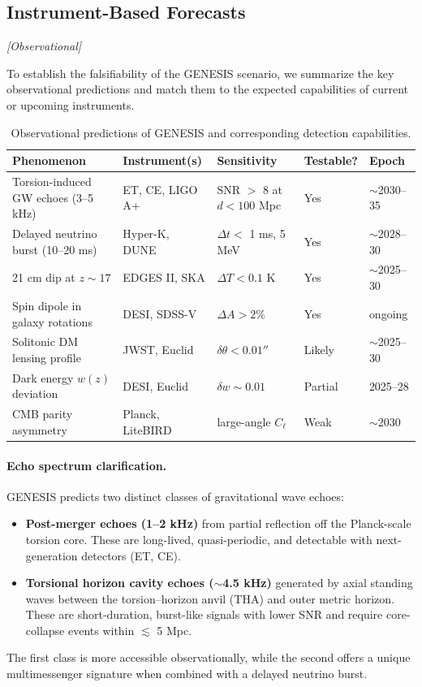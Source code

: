\documentclass{article}
\newcommand{\obstag}{\textcolor{green!60!black}{\textit{[Observational]}}}
\begin{document}
\subsection{Instrument-Based Forecasts}
\obstag


To establish the falsifiability of the GENESIS scenario, we summarize the key observational predictions
and match them to the expected capabilities of current or upcoming instruments.

\begin{table}[h!]
\centering
\caption{Observational predictions of GENESIS and corresponding detection capabilities.}
\begin{tabular}{lllll}
\toprule
\textbf{Phenomenon} & \textbf{Instrument(s)} & \textbf{Sensitivity} & \textbf{Testable?} & \textbf{Epoch} \\
\midrule
Torsion-induced GW echoes (3–5 kHz) & ET, CE, LIGO A+ & SNR $>$ 8 at $d < 100$ Mpc & Yes & $\sim$2030–35 \\
Delayed neutrino burst (10–20 ms) & Hyper-K, DUNE & $\Delta t <$ 1 ms, 5 MeV & Yes & $\sim$2028–30 \\
21 cm dip at $z \sim 17$ & EDGES II, SKA & $\Delta T < 0.1$ K & Yes & $\sim$2025–30 \\
Spin dipole in galaxy rotations & DESI, SDSS-V & $\Delta A > 2\%$ & Yes & ongoing \\
Solitonic DM lensing profile & JWST, Euclid & $\delta \theta < 0.01''$ & Likely & $\sim$2025–30 \\
Dark energy $w(z)$ deviation & DESI, Euclid & $\delta w \sim 0.01$ & Partial & 2025–28 \\
CMB parity asymmetry & Planck, LiteBIRD & large-angle $C_\ell$ & Weak & $\sim$2030 \\
\bottomrule
\end{tabular}
\end{table}

\paragraph{Echo spectrum clarification.}
GENESIS predicts two distinct classes of gravitational wave echoes:
\begin{itemize}
\item \textbf{Post-merger echoes (1–2 kHz)} from partial reflection off the Planck-scale torsion core. These are long-lived, quasi-periodic, and detectable with next-generation detectors (ET, CE).
\item \textbf{Torsional horizon cavity echoes ($\sim$4.5 kHz)} generated by axial standing waves between the torsion–horizon anvil (THA) and outer metric horizon. These are short-duration, burst-like signals with lower SNR and require core-collapse events within $\lesssim$ 5 Mpc.
\end{itemize}
The first class is more accessible observationally, while the second offers a unique multimessenger signature when combined with a delayed neutrino burst.
\end{document}
